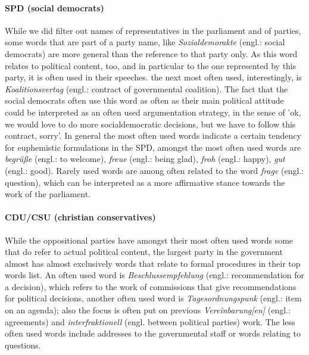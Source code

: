 \documentclass{article} %
\begin{document}
\paragraph{SPD (social democrats)}
While we did filter out names of representatives in the parliament and of parties, some words that are part of a party name, like {\em Sozialdemorakte} (engl.: social democrats) are more general than the reference to that party only. As this word relates to political content, too, and in particular to the one represented by this party, it is often used in their speeches. the next most often used, interestingly, is {\em Koalitionsvertag} (engl.: contract of governmental coalition). The fact that the social democrats often use this word as often as their main political attitude could be interpreted as an often used argumentation strategy, in the sense of 'ok, we would love to do more socialdemocratic decisions, but we have to follow this contract, sorry'. In general the most often used words indicate a certain tendency for euphemistic formulations in the SPD, amongst the most often used words are {\em begr\"u\ss{}e} (engl.: to welcome), {\em freue} (engl.: being glad), {\em froh} (engl.: happy), {\em gut} (engl.: good). Rarely used words are among often related to the word {\em frage} (engl.: question), which can be interpreted as a more affirmative stance towards the work of the parliament. 

\paragraph{CDU/CSU (christian conservatives)}
While the oppositional parties have amongst their most often used words some that do refer to actual political content, the largest party in the government almost has almost exclusively words that relate to formal procedures in their top words list. An often used word is {\em Beschlussempfehlung} (engl.: recommendation for a decision), which refers to the work of commissions that give recommendations for political decisions, another often used word is {\em Tagesordnungspunk} (engl.: item on an agenda); also the focus is often put on previous {\em Vereinbarung[en]} (engl.: agreements) and {\em interfraktionell} (engl. between political parties) work. The less often used words include addresses to the governmental staff or words relating to questions. 
\end{document}
